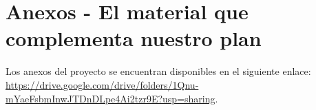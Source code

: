 \clearpage
\section{Anexos - El material que complementa nuestro plan}\label{sec:spmp-13}

Los anexos del proyecto se encuentran disponibles en el siguiente enlace: \url{https://drive.google.com/drive/folders/1Qnu-mYaeFsbmInwJTDnDLpe4Ai2tzr9E?usp=sharing}.
